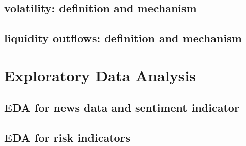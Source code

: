 \subsection{volatility: definition and mechanism}

\subsection{liquidity outflows: definition and mechanism}

\section{Exploratory Data Analysis}

\subsection{EDA for news data and sentiment indicator}

\subsection{EDA for risk indicators}

\cleardoublepage
